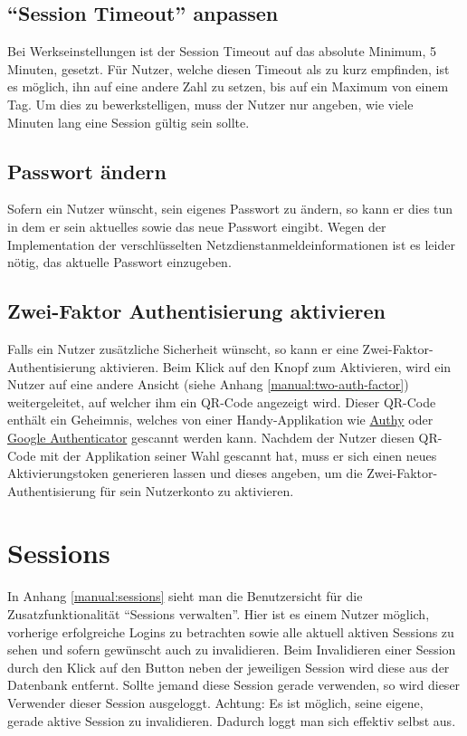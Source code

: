\documentclass[12pt,DIV14,BCOR10mm,a4paper,parskip=half-,headsepline,headinclude,english,ngerman,bibliography=totocnumbered]{scrreprt}
\begin{document}
\subsection{\enquote{Session Timeout} anpassen}

Bei Werkseinstellungen ist der Session Timeout auf das absolute Minimum, 5 Minuten, gesetzt.
Für Nutzer, welche diesen Timeout als zu kurz empfinden, ist es möglich, ihn auf eine andere Zahl zu setzen, bis auf ein Maximum von einem Tag.
Um dies zu bewerkstelligen, muss der Nutzer nur angeben, wie viele Minuten lang eine Session gültig sein sollte.

\subsection{Passwort ändern}

Sofern ein Nutzer wünscht, sein eigenes Passwort zu ändern, so kann er dies tun in dem er sein aktuelles sowie das neue Passwort eingibt.
Wegen der Implementation der verschlüsselten Netzdienstanmeldeinformationen ist es leider nötig, das aktuelle Passwort einzugeben.

\subsection{Zwei-Faktor Authentisierung aktivieren}

Falls ein Nutzer zusätzliche Sicherheit wünscht, so kann er eine Zwei-Faktor-Authentisierung aktivieren.
Beim Klick auf den Knopf zum Aktivieren, wird ein Nutzer auf eine andere Ansicht (siehe Anhang \ref{manual:two-auth-factor}) weitergeleitet, auf welcher ihm ein QR-Code angezeigt wird.
Dieser QR-Code enthält ein Geheimnis, welches von einer Handy-Applikation wie \href{https://authy.com/}{Authy}
 oder \href{https://play.google.com/store/apps/details?id=com.google.android.apps.authenticator2\&hl=en}{Google Authenticator} gescannt werden kann.
Nachdem der Nutzer diesen QR-Code mit der Applikation seiner Wahl gescannt hat, muss er sich einen neues Aktivierungstoken generieren lassen und dieses angeben, um die Zwei-Faktor-Authentisierung für sein Nutzerkonto zu aktivieren.

\section{Sessions}

In Anhang \autoref{manual:sessions} sieht man die Benutzersicht für die Zusatzfunktionalität \enquote{Sessions verwalten}.
Hier ist es einem Nutzer möglich, vorherige erfolgreiche Logins zu betrachten sowie alle aktuell aktiven Sessions zu sehen und sofern gewünscht auch zu invalidieren.
Beim Invalidieren einer Session durch den Klick auf den Button neben der jeweiligen Session wird diese aus der Datenbank entfernt.
Sollte jemand diese Session gerade verwenden, so wird dieser Verwender dieser Session ausgeloggt.
Achtung: Es ist möglich, seine eigene, gerade aktive Session zu invalidieren.
Dadurch loggt man sich effektiv selbst aus.
\end{document}
